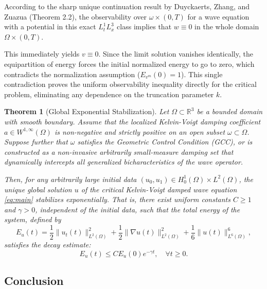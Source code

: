 \documentclass[11pt,letterpaper]{amsart}
\newtheorem{theorem}{Theorem}[section]
\begin{document}
According to the sharp unique continuation result by Duyckaerts, Zhang, and Zuazua \cite{Duyckaerts} (Theorem 2.2), the observability over $\omega \times (0,T)$ for a wave equation with a potential in this exact $L^1_t L^3_x$ class implies that $w \equiv 0$ in the whole domain $\Omega \times (0,T)$.

This immediately yields $v \equiv 0$. Since the limit solution vanishes identically, the equipartition of energy forces the initial normalized energy to go to zero, which contradicts the normalization assumption ($E_{v^m}(0) = 1$). This single contradiction proves the uniform observability inequality directly for the critical problem, eliminating any dependence on the truncation parameter $k$.


\begin{theorem}[Global Exponential Stabilization]\label{thm:global_stabilization}
Let $\Omega \subset \mathbb{R}^3$ be a bounded domain with smooth boundary. Assume that the localized Kelvin-Voigt damping coefficient $a \in W^{1,\infty}(\Omega)$ is non-negative and strictly positive on an open subset $\omega \subset \Omega$. Suppose further that $\omega$ satisfies the Geometric Control Condition (GCC), or is constructed as a non-invasive arbitrarily small-measure damping set that dynamically intercepts all generalized bicharacteristics of the wave operator.

Then, for any arbitrarily large initial data $(u_0, u_1) \in H_0^1(\Omega) \times L^2(\Omega)$, the unique global solution $u$ of the critical Kelvin-Voigt damped wave equation \eqref{eq:main} stabilizes exponentially. That is, there exist uniform constants $C \ge 1$ and $\gamma > 0$, independent of the initial data, such that the total energy of the system, defined by
\begin{equation}
    E_u(t) = \frac{1}{2}\|u_t(t)\|_{L^2(\Omega)}^2 + \frac{1}{2}\|\nabla u(t)\|_{L^2(\Omega)}^2 + \frac{1}{6}\|u(t)\|_{L^6(\Omega)}^6,
\end{equation}
satisfies the decay estimate:
\begin{equation}\label{eq:exponential_decay}
    E_u(t) \le C E_u(0) e^{-\gamma t}, \quad \forall t \ge 0.
\end{equation}
\end{theorem}


\subsection{Conclusion}
\end{document}
